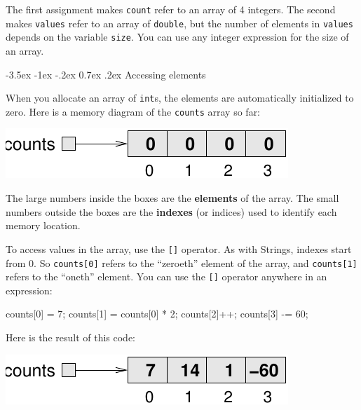 \documentclass[12pt]{book}
\makeatletter
\theoremstyle{exercise}
\newcommand{\java}[1]{\verb"#1"}
\renewcommand{\section}{\@startsection{section}{1}{\z@}%
    {-3.5ex \@plus -1ex \@minus -.2ex}%
    {0.7ex \@plus.2ex}%
    {\normalfont\Large\bfseries}}
\newcommand{\java}[1]{\lstinline{#1}} %
\makeatother
\begin{document}
The first assignment makes \java{count} refer to an array of 4 integers.
The second makes \java{values} refer to an array of \java{double}, but the number of elements in \java{values} depends on the variable \java{size}.
You can use any integer expression for the size of an array.


\section{Accessing elements}


When you allocate an array of \java{int}s, the elements are automatically initialized to zero.
Here is a memory diagram of the \java{counts} array so far:

\begin{center}
\includegraphics{figs/array.pdf}
\end{center}


The large numbers inside the boxes are the {\bf elements} of the array.
The small numbers outside the boxes are the {\bf indexes} (or indices) used to identify each memory location.

To access values in the array, use the \java{[]} operator.
As with Strings, indexes start from 0.
So \java{counts[0]} refers to the ``zeroeth'' element of the array, and \java{counts[1]} refers to the ``oneth'' element.
You can use the \java{[]} operator anywhere in an expression:

\begin{code}
    counts[0] = 7;
    counts[1] = counts[0] * 2;
    counts[2]++;
    counts[3] -= 60;
\end{code}

Here is the result of this code:

\begin{center}
\includegraphics{figs/array2.pdf}
\end{center}
\end{document}
